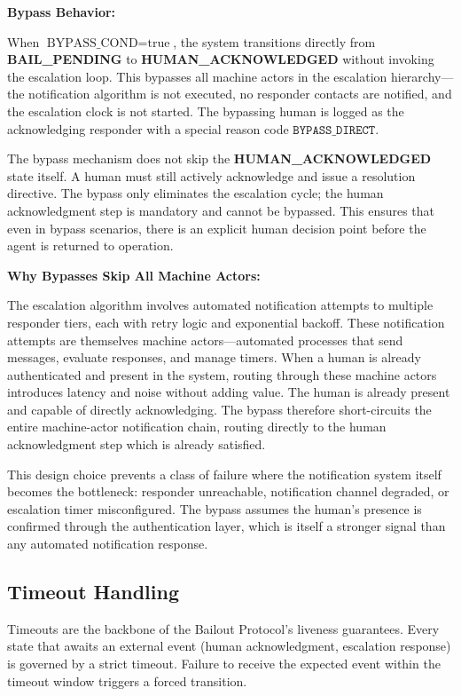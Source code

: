 \medskip\noindent\textbf{Bypass Behavior:}

When $\text{BYPASS\_COND} = \text{true}$, the system transitions directly from \textbf{BAIL\_PENDING} to \textbf{HUMAN\_ACKNOWLEDGED} without invoking the escalation loop. This bypasses all machine actors in the escalation hierarchy---the notification algorithm is not executed, no responder contacts are notified, and the escalation clock is not started. The bypassing human is logged as the acknowledging responder with a special reason code $\texttt{BYPASS\_DIRECT}$.

The bypass mechanism does not skip the \textbf{HUMAN\_ACKNOWLEDGED} state itself. A human must still actively acknowledge and issue a resolution directive. The bypass only eliminates the escalation cycle; the human acknowledgment step is mandatory and cannot be bypassed. This ensures that even in bypass scenarios, there is an explicit human decision point before the agent is returned to operation.

\medskip\noindent\textbf{Why Bypasses Skip All Machine Actors:}

The escalation algorithm involves automated notification attempts to multiple responder tiers, each with retry logic and exponential backoff. These notification attempts are themselves machine actors---automated processes that send messages, evaluate responses, and manage timers. When a human is already authenticated and present in the system, routing through these machine actors introduces latency and noise without adding value. The human is already present and capable of directly acknowledging. The bypass therefore short-circuits the entire machine-actor notification chain, routing directly to the human acknowledgment step which is already satisfied.

This design choice prevents a class of failure where the notification system itself becomes the bottleneck: responder unreachable, notification channel degraded, or escalation timer misconfigured. The bypass assumes the human's presence is confirmed through the authentication layer, which is itself a stronger signal than any automated notification response.

\subsection{Timeout Handling}
\label{sec:timeouts}

Timeouts are the backbone of the Bailout Protocol's liveness guarantees. Every state that awaits an external event (human acknowledgment, escalation response) is governed by a strict timeout. Failure to receive the expected event within the timeout window triggers a forced transition.


